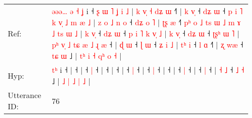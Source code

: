 \documentclass[10pt]{article}
\DeclareRobustCommand{\hl}[1]{{\textcolor{red}{#1}}}
\begin{document}
\begin{longtable}{ll}
Ref: & \hl{ə}\hl{ə}\hl{ə}\hl{…}\hl{ }\hl{ə}\hl{ }\hl{˧}\hl{ }\hl{ʝ} i ˧\hl{ }\hl{ʂ}\hl{ }\hl{ɯ}\hl{ }\hl{˥}\hl{ }\hl{ʝ}\hl{ }\hl{i}\hl{ }\hl{˩} |\hl{ }\hl{k}\hl{ }\hl{v}\hl{̩}\hl{ }\hl{˧}\hl{ }\hl{d}\hl{ʑ}\hl{ }\hl{ɯ} ˧\hl{˥} |\hl{ }\hl{k}\hl{ }\hl{v}\hl{̩} ˧\hl{ }\hl{d}\hl{ʑ} \hl{ɯ} ˧\hl{ }\hl{p}\hl{ }\hl{i}\hl{ }\hl{˥}\hl{ }\hl{k}\hl{ }\hl{v}\hl{̩}\hl{ }\hl{˩}\hl{ }\hl{m}\hl{ }\hl{æ}\hl{ }\hl{˩} |\hl{ }\hl{z}\hl{ }\hl{o}\hl{ }\hl{˩}\hl{ }\hl{n}\hl{ }\hl{o} ˧\hl{ }\hl{d}\hl{ʑ}\hl{ }\hl{o}\hl{ }\hl{˥} |\hl{ }\hl{ʈ}\hl{ʂ}\hl{ }\hl{æ} ˧\hl{˥}\hl{ }\hl{p}\hl{ʰ}\hl{ }\hl{o}\hl{ }\hl{˩}\hl{ }\hl{t}\hl{s}\hl{ }\hl{ɯ}\hl{ }\hl{˩}\hl{ }\hl{m}\hl{ }\hl{ɤ}\hl{ }\hl{˩}\hl{ }\hl{t}\hl{s}\hl{ }\hl{ɯ}\hl{ }\hl{˩} |\hl{ }\hl{k}\hl{ }\hl{v}\hl{̩} ˧\hl{ }\hl{d}\hl{ʑ} \hl{ɯ} ˧\hl{ }\hl{p}\hl{ }\hl{i}\hl{ }\hl{˥}\hl{ }\hl{k}\hl{ }\hl{v}\hl{̩}\hl{ }\hl{˩} |\hl{ }\hl{k}\hl{ }\hl{v}\hl{̩} ˧\hl{ }\hl{d}\hl{ʑ} \hl{ɯ} ˧\hl{ }\hl{ʈ}\hl{ʂ}\hl{ʰ}\hl{ }\hl{ɯ}\hl{ }\hl{˥} |\hl{ }\hl{p}\hl{ʰ}\hl{ }\hl{v}\hl{̩}\hl{ }\hl{˩}\hl{ }\hl{t}\hl{ɕ}\hl{ }\hl{æ}\hl{ }\hl{˩}\hl{ }\hl{ɻ}\hl{ }\hl{æ} ˧ |\hl{ }\hl{ɖ}\hl{ }\hl{ɯ} ˧\hl{ }\hl{ɭ} \hl{ɯ} ˧\hl{ }\hl{ʑ}\hl{ }\hl{i}\hl{ }\hl{˩} |\hl{ }\hl{t}\hl{ʰ}\hl{ }\hl{i} ˧\hl{ }\hl{l} \hl{ɑ} ˧\hl{˥} | \hl{ʐ} \hl{w}\hl{æ} ˧ \hl{t}\hl{ɕ} \hl{ɯ} ˩ |\hl{ }\hl{t}\hl{ʰ} \hl{i} \hl{˧} \hl{q}\hl{ʰ} \hl{o} \hl{˧} |
 \\
Hyp: & \hl{}\hl{}\hl{}\hl{}\hl{}\hl{}\hl{}\hl{}\hl{t}\hl{ʰ} i ˧\hl{}\hl{}\hl{}\hl{}\hl{}\hl{}\hl{}\hl{}\hl{}\hl{}\hl{}\hl{} |\hl{}\hl{}\hl{}\hl{}\hl{}\hl{}\hl{}\hl{}\hl{}\hl{}\hl{}\hl{} ˧\hl{} |\hl{}\hl{}\hl{}\hl{}\hl{} ˧\hl{}\hl{}\hl{} \hl{|} ˧\hl{}\hl{}\hl{}\hl{}\hl{}\hl{}\hl{}\hl{}\hl{}\hl{}\hl{}\hl{}\hl{}\hl{}\hl{}\hl{}\hl{}\hl{}\hl{} |\hl{}\hl{}\hl{}\hl{}\hl{}\hl{}\hl{}\hl{}\hl{}\hl{} ˧\hl{}\hl{}\hl{}\hl{}\hl{}\hl{}\hl{} |\hl{}\hl{}\hl{}\hl{}\hl{} ˧\hl{}\hl{}\hl{}\hl{}\hl{}\hl{}\hl{}\hl{}\hl{}\hl{}\hl{}\hl{}\hl{}\hl{}\hl{}\hl{}\hl{}\hl{}\hl{}\hl{}\hl{}\hl{}\hl{}\hl{}\hl{}\hl{}\hl{}\hl{} |\hl{}\hl{}\hl{}\hl{}\hl{} ˧\hl{}\hl{}\hl{} \hl{|} ˧\hl{}\hl{}\hl{}\hl{}\hl{}\hl{}\hl{}\hl{}\hl{}\hl{}\hl{}\hl{}\hl{} |\hl{}\hl{}\hl{}\hl{}\hl{} ˧\hl{}\hl{}\hl{} \hl{|} ˧\hl{}\hl{}\hl{}\hl{}\hl{}\hl{}\hl{}\hl{} |\hl{}\hl{}\hl{}\hl{}\hl{}\hl{}\hl{}\hl{}\hl{}\hl{}\hl{}\hl{}\hl{}\hl{}\hl{}\hl{}\hl{}\hl{}\hl{} ˧ |\hl{}\hl{}\hl{}\hl{} ˧\hl{}\hl{} \hl{|} ˧\hl{}\hl{}\hl{}\hl{}\hl{}\hl{} |\hl{}\hl{}\hl{}\hl{}\hl{} ˧\hl{}\hl{} \hl{|} ˧\hl{} | \hl{˧} \hl{}\hl{˩} ˧ \hl{}\hl{˩} \hl{˧} ˩ |\hl{}\hl{}\hl{} \hl{˩} \hl{|} \hl{}\hl{˩} \hl{|} \hl{˩} |
 \\
\midrule
Utterance ID: & 76 \\

\end{longtable}
\end{document}
